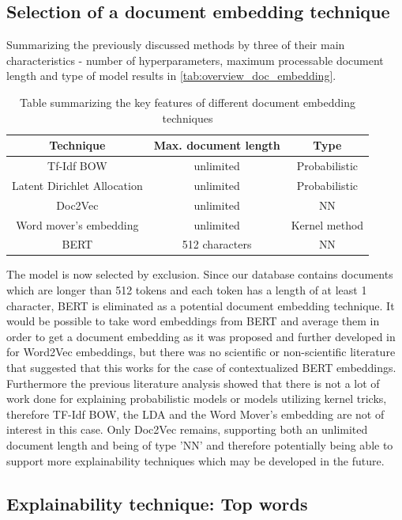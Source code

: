 \subsection{Selection of a document embedding technique}

Summarizing the previously discussed methods by three of their main characteristics - number of hyperparameters, maximum processable document length and type of model results in  \autoref{tab:overview_doc_embedding}.
\begin{table}
	\centering
	\begin{tabular}{ c | c | c }
		\hline 
		Technique & Max. document length & Type \\ \hline
		Tf-Idf BOW & unlimited & Probabilistic \\ \hline
		Latent Dirichlet Allocation & unlimited & Probabilistic \\ \hline
		Doc2Vec & unlimited & NN \\ \hline
		Word mover's embedding & unlimited & Kernel method \\ \hline
		BERT & 512 characters & NN \\ \hline
	\end{tabular}
	\caption{\label{tab:overview_doc_embedding} Table summarizing the key features of different document embedding techniques}
\end{table}

The model is now selected by exclusion. Since our database contains documents which are longer than 512 tokens and each token has a length of at least 1 character, BERT is eliminated as a potential document embedding technique. It would be possible to take word embeddings from BERT and average them in order to get a document embedding as it was proposed and further developed in \cite{deboomRepresentationLearningVery2016} for Word2Vec embeddings, but there was no scientific or non-scientific literature that suggested that this works for the case of contextualized BERT embeddings.
Furthermore the previous literature analysis showed that there is not a lot of work done for explaining probabilistic models or models utilizing kernel tricks, therefore TF-Idf BOW, the LDA and the Word Mover's embedding are not of interest in this case. Only Doc2Vec remains, supporting both an unlimited document length and being of type 'NN' and therefore potentially being able to support more explainability techniques which may be developed in the future.

\subsection{Explainability technique: Top words}

